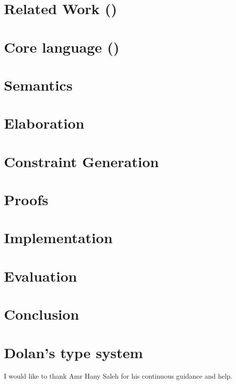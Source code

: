 \documentclass[sigplan,10pt]{acmart}\settopmatter{printfolios=true}
\begin{document}
\section{Related Work (\eff)}




\section{Core language (\core)}







\section{Semantics}


\section{Elaboration}


\section{Constraint Generation}


\section{Proofs}


\section{Implementation}


\section{Evaluation}


\section{Conclusion}


\appendix
\section{Dolan's type system}


\begin{acks}
  I would like to thank Amr Hany Saleh for his continuous guidance and help.
\end{acks}


\nocite{*}
\end{document}
